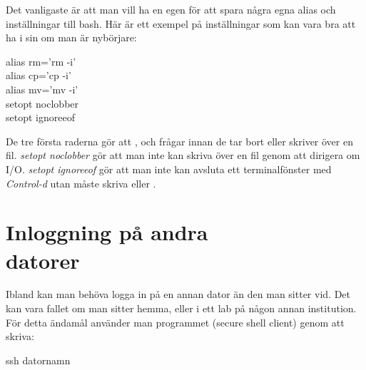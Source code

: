 \documentclass[a4paper,twocolumn]{book}
\begin{document}
Det vanligaste är att man vill ha en egen  för att
spara några egna alias och inställningar till bash. Här är ett exempel
på inställningar som kan vara bra att ha i sin  om man
är nybörjare:
\begin{ttquote}
  alias rm='rm -i' \\
  alias cp='cp -i' \\
  alias mv='mv -i' \\
  setopt noclobber \\
  setopt ignoreeof
\end{ttquote}
De tre första raderna gör att ,  och
 frågar innan de tar bort eller skriver över en fil.
\emph{setopt noclobber} gör att man inte kan skriva över en fil genom
att dirigera om I/O. \emph{setopt ignoreeof} gör att man inte kan
avsluta ett terminalfönster med \emph{Control-d} utan måste skriva
 eller .

%
%

\section{Inloggning på andra \\ datorer}

Ibland kan man behöva logga in på en annan dator än den man sitter
vid. Det kan vara fallet om man sitter hemma, eller i ett lab på någon
annan institution. För detta ändamål
använder man programmet  (secure shell client) genom att
skriva:
\begin{ttquote}
  ssh datornamn \\
\end{ttquote}
\end{document}
